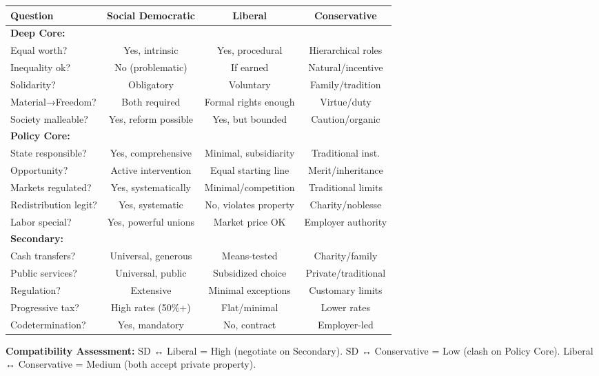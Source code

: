 \begin{tcolorbox}
\begin{table}[h]
\centering
\footnotesize
\renewcommand{\arraystretch}{1.2}
\begin{tabular}{@{}lccc@{}}
\toprule
\textbf{Question} & \textbf{Social Democratic} & \textbf{Liberal} & \textbf{Conservative} \\
\midrule
\textbf{Deep Core:} & & & \\
Equal worth? & Yes, intrinsic & Yes, procedural & Hierarchical roles \\
Inequality ok? & No (problematic) & If earned & Natural/incentive \\
Solidarity? & Obligatory & Voluntary & Family/tradition \\
Material→Freedom? & Both required & Formal rights enough & Virtue/duty \\
Society malleable? & Yes, reform possible & Yes, but bounded & Caution/organic \\
\midrule
\textbf{Policy Core:} & & & \\
State responsible? & Yes, comprehensive & Minimal, subsidiarity & Traditional inst. \\
Opportunity? & Active intervention & Equal starting line & Merit/inheritance \\
Markets regulated? & Yes, systematically & Minimal/competition & Traditional limits \\
Redistribution legit? & Yes, systematic & No, violates property & Charity/noblesse \\
Labor special? & Yes, powerful unions & Market price OK & Employer authority \\
\midrule
\textbf{Secondary:} & & & \\
Cash transfers? & Universal, generous & Means-tested & Charity/family \\
Public services? & Universal, public & Subsidized choice & Private/traditional \\
Regulation? & Extensive & Minimal exceptions & Customary limits \\
Progressive tax? & High rates (50\%+) & Flat/minimal & Lower rates \\
Codetermination? & Yes, mandatory & No, contract & Employer-led \\
\bottomrule
\end{tabular}
\end{table}

\textbf{Compatibility Assessment:} SD ↔ Liberal = High (negotiate on Secondary). SD ↔ Conservative = Low (clash on Policy Core). Liberal ↔ Conservative = Medium (both accept private property).

\end{tcolorbox}

